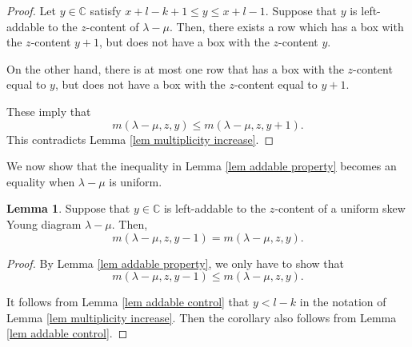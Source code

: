 \documentclass[11pt]{amsart}
\numberwithin{equation}{section}
\theoremstyle{definition}
\newtheorem{lemma}[thm]{Lemma}
\begin{document}
\begin{proof}
Let $y \in \mathbb C$ satisfy $x+l-k+1 \leq y \leq x+l-1$. Suppose that $y$ is left-addable to the $z$-content of $\lambda-\mu$. Then, there exists a row which has a box with the $z$-content $y+1$, but does not have a box with the $z$-content $y$. 

On the other hand, there is at most one row that has a box with the $z$-content equal to $y$, but does not have a box with the $z$-content equal to $y+1$.

These imply that
\[    m(\lambda-\mu, z, y)\leq m(\lambda-\mu, z, y+1) .\]
This contradicts Lemma \ref{lem multiplicity increase}.
\end{proof}






We now show that the inequality in Lemma \ref{lem addable property} becomes an equality when $\lambda-\mu$ is uniform.




\begin{lemma} \label{cor addable control}
Suppose that $y \in \mathbb C$ is left-addable to the $z$-content of a uniform skew Young diagram $\lambda-\mu$. Then, \[   m(\lambda-\mu, z, y-1) =   m(\lambda-\mu, z, y) .  \]
\end{lemma}

\begin{proof}
By Lemma \ref{lem addable property}, we only have to show that
\[   m(\lambda-\mu, z, y-1) \leq m(\lambda-\mu, z, y) .
\]

It follows from Lemma \ref{lem addable control} that $y <l-k$ in the notation of Lemma  \ref{lem multiplicity increase}. Then the corollary also follows from Lemma \ref{lem addable control}.
\end{proof}






\end{document}
